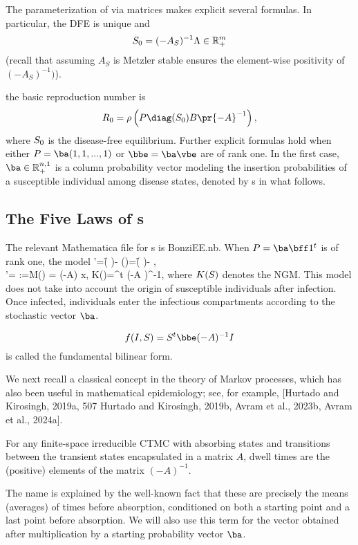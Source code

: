 The parameterization of  via matrices makes explicit several formulas. In particular,
\BEN \im
the DFE is unique and \sats\
$$S_0=(-A_S)^{-1}\Lambda\in \mathbb{R}_+^m$$
(recall that assuming $A_S$ is Metzler stable ensures the element-wise positivity of $(-A_S)^{-1})$).

\im
the basic reproduction number is
$${R}_0 = \rho\left(P \diag(\y_0) B \pr{-A}^{-1}\right),$$
where $S_0$ is the disease-free equilibrium.
\EEN
 Further explicit formulas hold when either $P=\ba (1,1, ...,1)$ or $\bbe=\ba \vbe$ are of rank one. In the first case,
$\ba\in \mathbb{R}_+^{n,1}$ is a column probability vector modeling the insertion probabilities of a susceptible individual among disease states, denoted by \ABa s in what follows.


\subsection{The Five Laws of \ABa s}

The relevant Mathematica file for \ABa s is BonziEE.nb. When $P=\ba \bff 1^t$ is of rank one, the \ABP model \mbw
\be{FIS0}
\bc
\y'=\f( \y)- \diag[\y](\bbe \x)=\f( \y)- \diag[\bbe \x] \y , \\
\x'= \x:=M(\y) \x= (-A) x, K(\y)=\ba \y^t \bbe (-A )^{-1},
\ec
\ee
where $K(S)$ denotes the NGM. This model does not take into account the origin of susceptible individuals after infection. Once infected, individuals enter the infectious compartments according to the stochastic vector $\ba$.


\begin{definition} $$f(\x,\y)= \y^t \bbe (-A )^{-1} \x $$ is called the fundamental bilinear form.
\end{definition}

We next recall a classical concept in the theory of Markov processes, which has also been useful in mathematical epidemiology; see, for example, [Hurtado and Kirosingh, 2019a,
507
Hurtado and Kirosingh, 2019b, Avram et al., 2023b, Avram et al., 2024a].
\begin{definition} [dwell times] For any finite-space irreducible CTMC with absorbing states and transitions between the transient states encapsulated in a matrix $A$, dwell times are the (positive) elements of the matrix $(-A)^{-1}$. \end{definition}

The name is explained by the well-known fact that these are precisely the means (averages) of times before absorption, conditioned on both a starting point and a last point before absorption. We will also use this term for the vector obtained after multiplication by a starting probability vector $\ba$.

